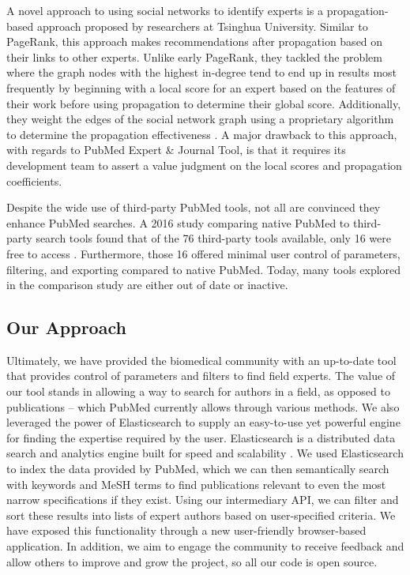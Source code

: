 A novel approach to using social networks to identify experts is a propagation-based approach proposed by researchers at Tsinghua University. Similar to PageRank, this approach makes recommendations after propagation based on their links to other experts. Unlike early PageRank, they tackled the problem where the graph nodes with the highest in-degree tend to end up in results most frequently by beginning with a local score for an expert based on the features of their work before using propagation to determine their global score. Additionally, they weight the edges of the social network graph using a proprietary algorithm to determine the propagation effectiveness \cite{ref-expert-social-network}. A major drawback to this approach, with regards to PubMed Expert \& Journal Tool, is that it requires its development team to assert a value judgment on the local scores and propagation coefficients.

Despite the wide use of third-party PubMed tools, not all are convinced they enhance PubMed searches. A 2016 study comparing native PubMed to third-party search tools found that of the 76 third-party tools available, only 16 were free to access \cite{ref-pubmed-third-party}. Furthermore, those 16 offered minimal user control of parameters, filtering, and exporting compared to native PubMed. Today, many tools explored in the comparison study are either out of date or inactive.

\subsection{Our Approach}

Ultimately, we have provided the biomedical community with an up-to-date tool that provides control of parameters and filters to find field experts. The value of our tool stands in allowing a way to search for authors in a field, as opposed to publications – which PubMed currently allows through various methods. We also leveraged the power of Elasticsearch to supply an easy-to-use yet powerful engine for finding the expertise required by the user. Elasticsearch is a distributed data search and analytics engine built for speed and scalability \cite{ref-elasticsearch}. We used Elasticsearch to index the data provided by PubMed, which we can then semantically search with keywords and MeSH terms to find publications relevant to even the most narrow specifications if they exist. Using our intermediary API, we can filter and sort these results into lists of expert authors based on user-specified criteria. We have exposed this functionality through a new user-friendly browser-based application. In addition, we aim to engage the community to receive feedback and allow others to improve and grow the project, so all our code is open source.
